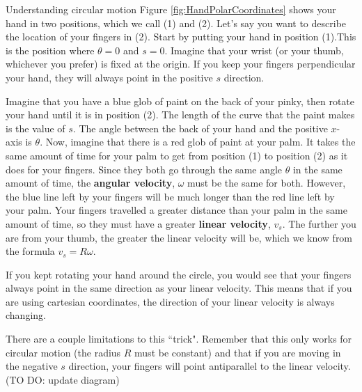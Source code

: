 \begin{studentopinionOW}{Understanding circular motion}
Figure \ref{fig:HandPolarCoordinates} shows your hand in two positions, which we call (1) and (2). Let's say you want to describe the location of your fingers in (2). Start by putting your hand in position (1).This is the position where $\theta=0$ and $s=0$. Imagine that your wrist (or your thumb, whichever you prefer) is fixed at the origin. If you keep your fingers perpendicular your hand, they will always point in the positive $s$ direction. 

Imagine that you have a blue glob of paint on the back of your pinky, then rotate your hand until it is in position (2). The length of the curve that the paint makes is the value of $s$. The angle between the back of your hand and the positive $x$-axis is $\theta$. Now, imagine that there is a red glob of paint at your palm. It takes the same amount of time for your palm to get from position (1) to position (2) as it does for your fingers. Since they both go through the same angle $\theta$ in the same amount of time, the \textbf{angular velocity}, $\omega$ must be the same for both. However, the blue line left by your fingers will be much longer than the red line left by your palm. Your fingers travelled a greater distance than your palm in the same amount of time, so they must have a greater \textbf{linear velocity}, $v_s$. The further you are from your thumb, the greater the linear velocity will be, which we know from the formula $v_s=R\omega$.

If you kept rotating your hand around the circle, you would see that your fingers always point in the same  direction as your linear velocity. This means that if you are using cartesian coordinates, the direction of your linear velocity is always changing.

There are a couple limitations to this ``trick". Remember that this only works for circular motion (the radius $R$ must be constant) and that if you are moving in the negative $s$ direction, your fingers will point antiparallel to the linear velocity.(TO DO: update diagram)

\end{studentopinionOW}

